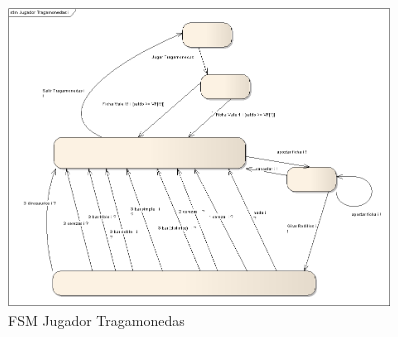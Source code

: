         \begin{figure}[p!hbt]
		\centering
		\includegraphics[angle=90, width=0.9\textwidth]{../img/FSM_JugadorTragamonedas.png}
		\caption{FSM Jugador Tragamonedas }
		\label{fig:FSMjugadorTraga}
	\end{figure}



